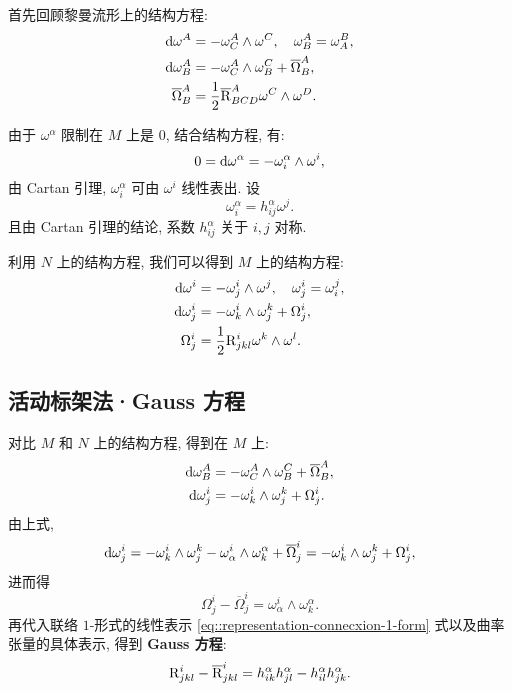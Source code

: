 \documentclass{ctexart}
\begin{document}
首先回顾黎曼流形上的结构方程:
\begin{align*}
	\mathop{}\!\mathrm{d}\omega^{A} &= -\omega_{C}^{A} \wedge \omega^{C},\quad \omega^{A}_{B} = \omega^{B}_{A}, \\
	\mathop{}\!\mathrm{d}\omega^{A}_{B} &= -\omega^{A}_{C} \wedge \omega^{C}_{B} + \overline{\Omega}^{A}_{B}, \\
	\overline{\Omega}^{A}_{B} &= \frac{1}{2}\overline{\mathrm{R}}^{A}_{BCD}\omega^{C} \wedge \omega^{D}.
\end{align*}

由于 $\omega^{\alpha}$ 限制在 $M$ 上是 $0$, 结合结构方程, 有:
\[
	0 = \mathop{}\!\mathrm{d}\omega^{\alpha} = -\omega_{i}^{\alpha} \wedge \omega^{i},
\]
由 Cartan 引理, $\omega^{\alpha}_{i}$ 可由 $\omega^{i}$ 线性表出. 设 
\begin{equation}\label{eq::representation-connecxion-1-form}
	\omega^{\alpha}_{i} = h^{\alpha}_{ij}\omega^{j}.	
\end{equation}
且由 Cartan 引理的结论, 系数 $h^{\alpha}_{ij}$ 关于 $i, j$ 对称.

利用 $N$ 上的结构方程, 我们可以得到 $M$ 上的结构方程:
\begin{align*}
	\mathop{}\!\mathrm{d}\omega^{i} &= -\omega^{i}_{j} \wedge \omega^{j}, \quad \omega^{i}_{j} = \omega^{j}_{i}, \\
	\mathop{}\!\mathrm{d}\omega^{i}_{j} &= -\omega^{i}_{k} \wedge \omega^{k}_{j} + \Omega^{i}_{j}, \\
	\Omega^{i}_{j} &= \frac{1}{2}\mathrm{R}^{i}_{jkl}\omega^{k} \wedge \omega^{l}.
\end{align*}

\subsection{活动标架法·Gauss 方程}
对比 $M$ 和 $N$ 上的结构方程, 得到在 $M$ 上:
\begin{align*}
\mathop{}\!\mathrm{d}\omega^{A}_{B} &= -\omega^{A}_{C} \wedge \omega^{C}_{B} + \overline{\Omega}^{A}_{B}, \\
\mathop{}\!\mathrm{d}\omega^{i}_{j} &= -\omega^{i}_{k} \wedge \omega^{k}_{j} + \Omega^{i}_{j}.
\end{align*}
由上式,
$$
	\mathop{}\!\mathrm{d}\omega^{i}_{j} = -\omega^{i}_{k} \wedge \omega^{k}_{j} - \omega^{i}_{\alpha} \wedge \omega^{\alpha}_{k} + \overline{\Omega}^{i}_{j} = -\omega^{i}_{k} \wedge \omega^{k}_{j} + \Omega^{i}_{j},
$$
进而得
$$
	\Omega^{i}_{j} - \overline{\Omega}^{i}_{j} = \omega^{i}_{\alpha} \wedge \omega^{\alpha}_{k}.
$$
再代入联络 $1$-形式的线性表示 \ref{eq::representation-connecxion-1-form} 式以及曲率张量的具体表示, 得到 {\bf Gauss 方程}:
\begin{equation}\label{eq::Gauss-equation-local}
	\mathrm{R}^{i}_{jkl} - \overline{\mathrm{R}}^{i}_{jkl} = h^{\alpha}_{ik}h^{\alpha}_{jl} - h^{\alpha}_{il}h^{\alpha}_{jk}.
\end{equation}
\end{document}

